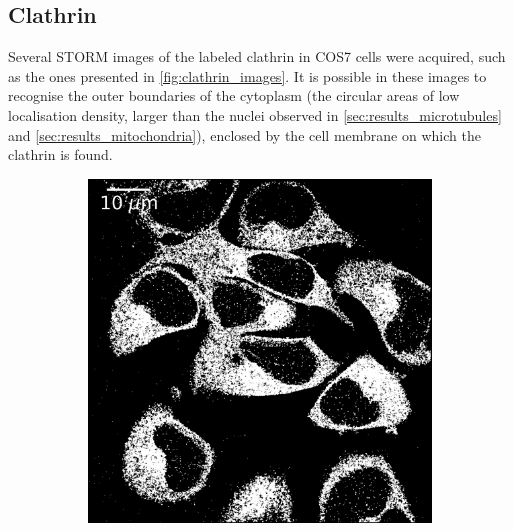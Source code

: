 \subsection{Clathrin} \label{sec:results_clathrin}
Several STORM images of the labeled clathrin in COS7 cells were acquired, such as the ones presented in \autoref{fig:clathrin_images}.
It is possible in these images to recognise the outer boundaries of the cytoplasm (the circular areas of low localisation density, larger than the nuclei observed in \autoref{sec:results_microtubules} and \autoref{sec:results_mitochondria}), enclosed by the cell membrane on which the clathrin is found.

\begin{figure}
    \centering
    \begin{subfigure}{0.49\textwidth}
        \includegraphics[width=\textwidth]{figures/clathrin_image11.png}
        \caption{}
        \label{fig:clathrin_image1}
    \end{subfigure}
    \begin{subfigure}{0.49\textwidth}

\end{subfigure}
\end{figure}
